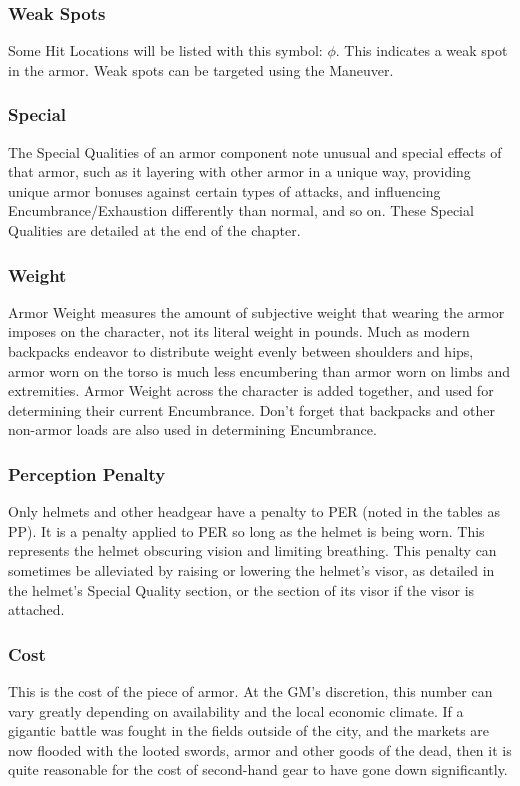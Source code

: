 \documentclass[oneside,11pt,english]{book}
\begin{document}
\subsubsection{Weak Spots}\label{sec:Weak Spots}
Some Hit Locations will be listed with this symbol: $\phi$. This indicates a weak spot in the armor. Weak spots can be targeted using the  Maneuver.

\subsubsection{Special}
The Special Qualities of an armor component note unusual and special effects of that armor, such as it layering with other armor in a unique way, providing unique armor bonuses against certain types of attacks, and influencing Encumbrance/Exhaustion differently than normal, and so on. These Special Qualities are detailed at the end of the chapter.

\subsubsection{Weight}
Armor Weight measures the amount of subjective weight that wearing the armor imposes on the character, not its 
literal weight in pounds. Much as modern backpacks endeavor to distribute weight evenly between shoulders and hips,
armor worn on the torso is much less encumbering than armor worn on limbs and extremities.
Armor Weight across the character is added together, and used for determining their current Encumbrance. Don’t 
forget that backpacks and other non-armor loads are also used in determining Encumbrance.

\subsubsection{Perception Penalty}
Only helmets and other headgear have a penalty to PER (noted in the tables as PP). It is a penalty applied to PER so long as the helmet is being worn. This represents the helmet obscuring vision and limiting breathing. This penalty can sometimes be alleviated by raising or lowering the helmet’s visor, as detailed in the helmet’s Special Quality section, or the section of its visor if the visor is attached.

\subsubsection{Cost}
This is the cost of the piece of armor. At the GM’s discretion, this number can vary greatly depending on availability 
and the local economic climate. If a gigantic battle was fought in the fields outside of the city, and the markets are 
now flooded with the looted swords, armor and other goods of the dead, then it is quite reasonable for the cost of 
second-hand gear to have gone down significantly.
\end{document}
